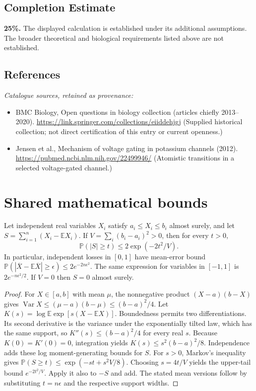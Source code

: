 \documentclass[11pt]{article}
\begin{document}
\subsection{Completion Estimate}
\textbf{25\%.} The displayed calculation is established under its additional assumptions. The broader theoretical and biological requirements listed above are not established.
\subsection{References}
\noindent\emph{Catalogue sources, retained as provenance:}
\begin{itemize}
\item BMC Biology, Open questions in biology collection (articles chiefly 2013--2020). \url{https://link.springer.com/collections/eiiddehjgj} (Supplied historical collection; not direct certification of this entry or current openness.)
\item Jensen et al., Mechanism of voltage gating in potassium channels (2012). \url{https://pubmed.ncbi.nlm.nih.gov/22499946/} (Atomistic transitions in a selected voltage-gated channel.)
\end{itemize}




\section{Shared mathematical bounds}\label{app:bounds}
\begin{lemma}\label{lem:bounded}
Let independent real variables $X_i$ satisfy $a_i\leq X_i\leq b_i$ almost surely,
and let $S=\sum_{i=1}^n(X_i-\mathbb{E} X_i)$. If
$V=\sum_i(b_i-a_i)^2>0$, then for every $t>0$,
\[
 \mathbb{P}(|S|\geq t)\leq 2\exp(-2t^2/V).
\]
In particular, independent losses in $[0,1]$ have mean-error bound
$\mathbb{P}(|\overline X-\mathbb{E}\overline X|\geq\epsilon)
\leq2e^{-2n\epsilon^2}$. The same expression for variables in $[-1,1]$
is $2e^{-n\epsilon^2/2}$. If $V=0$ then $S=0$ almost surely.
\end{lemma}
\begin{proof}
For $X\in[a,b]$ with mean $\mu$, the nonnegative product
$(X-a)(b-X)$ gives
$\operatorname{Var} X\leq(\mu-a)(b-\mu)\leq(b-a)^2/4$.
Let $K(s)=\log\mathbb{E}\exp[s(X-\mathbb{E} X)]$.
Boundedness permits two differentiations. Its second derivative is the variance
under the exponentially tilted law, which has the same support, so
$K''(s)\leq(b-a)^2/4$ for every real $s$.
Because $K(0)=K'(0)=0$, integration yields
$K(s)\leq s^2(b-a)^2/8$.
Independence adds these log moment-generating bounds for $S$.
For $s>0$, Markov's inequality gives
$\mathbb{P}(S\geq t)\leq\exp(-st+s^2V/8)$.
Choosing $s=4t/V$ yields the upper-tail bound $e^{-2t^2/V}$.
Apply it also to $-S$ and add. The stated mean versions follow by substituting
$t=n\epsilon$ and the respective support widths.
\end{proof}
\end{document}
